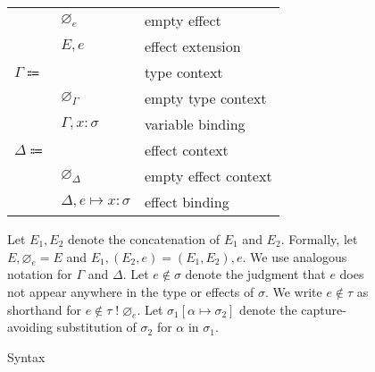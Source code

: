 \documentclass[12pt]{article}
\newcommand\parens[1]{\left( #1 \right)} %
\newcommand\evar{x}
\newcommand\ttype{\tau}
\newcommand\tvar{\alpha}
\newcommand\tanno[2]{#1 : #2} %
\newcommand\tx{\sigma}
\newcommand\twithx[2]{#1 \; ! \; #2} %
\newcommand\tsub[3]{#1 \left[ #2 \mapsto #3 \right]} %
\newcommand\xeffect{e}
\newcommand\xeffects{E}
\newcommand\xempty{\varnothing_{\xeffect}}
\newcommand\xextend[2]{#1, #2}
\newcommand\xunion[2]{#1, #2}
\newcommand\xnotint[2]{#1 \notin #2} %
\newcommand\ccontext{\Gamma}
\newcommand\cempty{\varnothing_{\ccontext}}
\newcommand\cextend[2]{#1, #2}
\newcommand\dcontext{\Delta}
\newcommand\dempty{\varnothing_{\dcontext}}
\newcommand\dextend[2]{#1, #2}
\newcommand\deffect[3]{#1 \mapsto \tanno{#2}{#3}} %
\begin{document}
\begin{figure}
\begin{mdframed}[backgroundcolor=none]
\begin{center}
\begin{tabular}{l l l}
          & $\xempty$ & empty effect \\
          & $\xextend{\xeffects}{\xeffect}$ & effect extension \\
          $\ccontext \Coloneqq$ & & type context \\
          & $\cempty$ & empty type context \\
          & $\cextend{\ccontext}{\tanno{\evar}{\tx}}$ & variable binding \\
          $\dcontext \Coloneqq$ & & effect context \\
          & $\dempty$ & empty effect context \\
          & $\dextend{\dcontext}{\deffect{\xeffect}{\evar}{\tx}}$ & effect binding \\
        \end{tabular}
      \end{center}

      \bigskip

      Let $\xunion{\xeffects_1}{\xeffects_2}$ denote the concatenation of $\xeffects_1$ and $\xeffects_2$. Formally, let $\xunion{\xeffects}{\xempty} = \xeffects$ and $\xunion{\xeffects_1}{\parens{\xextend{\xeffects_2}{\xeffect}}} = \xextend{\parens{\xunion{\xeffects_1}{\xeffects_2}}}{\xeffect}$. We use analogous notation for $\ccontext$ and $\dcontext$. Let $\xnotint{\xeffect}{\tx}$ denote the judgment that $\xeffect$ does not appear anywhere in the type or effects of $\tx$. We write $\xnotint{\xeffect}{\ttype}$ as shorthand for $\xnotint{\xeffect}{\twithx{\ttype}{\xempty}}$. Let $\tsub{\tx_1}{\tvar}{\tx_2}$ denote the capture-avoiding substitution of $\tx_2$ for $\tvar$ in $\tx_1$.

      \caption{Syntax}\label{fig:syntax}
    \end{mdframed}
  \end{figure}
\end{document}
